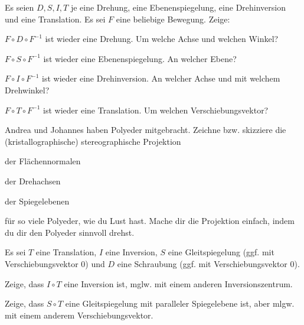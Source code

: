 \begin{sheet}
\begin{problem}[title={Konjugation geometrisch}, difficulty={mittel}]
Es seien $D,S,I,T$ je eine Drehung, eine Ebenenspiegelung, eine Drehinversion und eine Translation. Es sei $F$ eine beliebige Bewegung. Zeige:
\begin{subproblem}
$F\circ D\circ F^{-1}$ ist wieder eine Drehung. Um welche Achse und welchen Winkel?
\end{subproblem}
\begin{subproblem}
$F\circ S\circ F^{-1}$ ist wieder eine Ebenenspiegelung. An welcher Ebene?
\end{subproblem}
\begin{subproblem}
$F\circ I\circ F^{-1}$ ist wieder eine Drehinversion. An welcher Achse und mit welchem Drehwinkel?
\end{subproblem}
\begin{subproblem}
$F\circ T\circ F^{-1}$ ist wieder eine Translation. Um welchen Verschiebungsvektor?
\end{subproblem}
\end{problem}

\begin{problem}
	Andrea und Johannes haben Polyeder mitgebracht. Zeichne bzw. skizziere die (kristallographische) stereographische Projektion
	\begin{subproblem}
		der Flächennormalen
	\end{subproblem}
	\begin{subproblem}
		der Drehachsen
	\end{subproblem}
	\begin{subproblem}
		der Spiegelebenen
	\end{subproblem}
	für so viele Polyeder, wie du Lust hast. Mache dir die Projektion einfach, indem du dir den Polyeder sinnvoll drehst. 
\end{problem}

\begin{problem}[title={Einige Nebenklassen der Translationsuntergruppe}, difficulty={mittel}]
Es sei $T$ eine Translation, $I$ eine Inversion, $S$ eine Gleitspiegelung (ggf. mit Verschiebungsvektor $0$) und $D$ eine Schraubung (ggf. mit Verschiebungsvektor 0).

\begin{subproblem}
Zeige, dass $I\circ T$ eine Inversion ist, mglw. mit einem anderen Inversionszentrum.
\end{subproblem}
\end{problem}
\begin{subproblem}
Zeige, dass $S\circ T$ eine Gleitspiegelung mit paralleler Spiegelebene ist, aber mlgw. mit einem anderem Verschiebungsvektor.


\end{subproblem}
\end{sheet}
